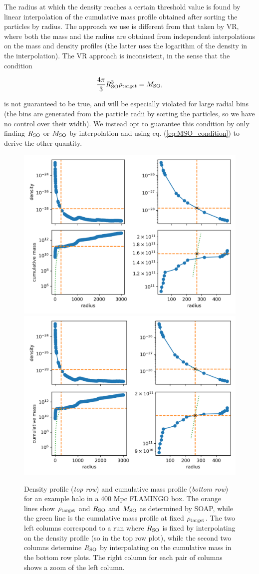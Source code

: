 \documentclass{article}
\begin{document}
The radius at which the density reaches a certain threshold value is found by linear interpolation of the 
cumulative mass profile obtained after sorting the particles by radius. The approach we use is different from 
that taken by VR, where both the mass and the radius are obtained from independent interpolations on the mass 
and density profiles (the latter uses the logarithm of the density in the interpolation). The VR approach is 
inconsistent, in the sense that the condition

\begin{equation}
    \frac{4\pi{}}{3} R_{\rm{}SO}^3 \rho{}_{\rm{}target} = M_{\rm{}SO},\label{eq:MSO_condition}
\end{equation}

is not guaranteed to be true, and will be especially violated for large radial bins (the bins are generated 
from the particle radii by sorting the particles, so we have no control over their width). We instead opt to 
guarantee this condition by only finding $R_{\rm{}SO}$ or $M_{\rm{}SO}$ by interpolation and using eq. 
(\ref{eq:MSO_condition}) to derive the other quantity.

\begin{figure}
    \centering
    \includegraphics[width=0.48\textwidth{}]{image7.png}
    \includegraphics[width=0.48\textwidth{}]{image4.png}
    \caption{Density profile (\emph{top row}) and cumulative mass profile (\emph{bottom row}) for an example 
    halo in a 400 Mpc FLAMINGO box. The orange lines show $\rho{}_{\rm{}target}$ and $R_{\rm{}SO}$ and 
    $M_{\rm{}SO}$ as determined by SOAP, while the green line is the cumulative mass profile at fixed 
    $\rho{}_{\rm{}target}$. The two left columns correspond to a run where $R_{\rm{}SO}$ is fixed by 
    interpolating on the density profile (so in the top row plot), while the second two columns determine 
    $R_{\rm{}SO}$ by interpolating on the cumulative mass in the bottom row plots. The right column for each 
    pair of columns shows a zoom of the left column.}
    \label{fig:MSO_vs_RSO}
\end{figure}
\end{document}
